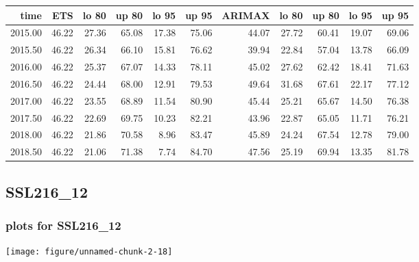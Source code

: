 \documentclass[10pt,a4paper]{article}\usepackage[]{graphicx}\usepackage[]{color}
\makeatletter
\def\maxwidth{ %
  \ifdim\Gin@nat@width>\linewidth
    \linewidth
  \else
    \Gin@nat@width
  \fi
}
\newcommand{\AaA}{\_}
\makeatother
\begin{document}
\begin{table}[ht]
\centering
\begin{tabular}{rrrrrrrrrrr}
  \hline
time & ETS  & lo 80 & up 80 & lo 95 & up 95 & ARIMAX  & lo 80 & up 80 & lo 95 & up 95 \\ 
  \hline
2015.00 & 46.22 & 27.36 & 65.08 & 17.38 & 75.06 & 44.07 & 27.72 & 60.41 & 19.07 & 69.06 \\ 
  2015.50 & 46.22 & 26.34 & 66.10 & 15.81 & 76.62 & 39.94 & 22.84 & 57.04 & 13.78 & 66.09 \\ 
  2016.00 & 46.22 & 25.37 & 67.07 & 14.33 & 78.11 & 45.02 & 27.62 & 62.42 & 18.41 & 71.63 \\ 
  2016.50 & 46.22 & 24.44 & 68.00 & 12.91 & 79.53 & 49.64 & 31.68 & 67.61 & 22.17 & 77.12 \\ 
  2017.00 & 46.22 & 23.55 & 68.89 & 11.54 & 80.90 & 45.44 & 25.21 & 65.67 & 14.50 & 76.38 \\ 
  2017.50 & 46.22 & 22.69 & 69.75 & 10.23 & 82.21 & 43.96 & 22.87 & 65.05 & 11.71 & 76.21 \\ 
  2018.00 & 46.22 & 21.86 & 70.58 & 8.96 & 83.47 & 45.89 & 24.24 & 67.54 & 12.78 & 79.00 \\ 
  2018.50 & 46.22 & 21.06 & 71.38 & 7.74 & 84.70 & 47.56 & 25.19 & 69.94 & 13.35 & 81.78 \\ 
   \hline
\end{tabular}
\end{table}

\newpage
\subsection{SSL216\AaA 12}
\subsubsection{plots for SSL216\AaA 12}

\texttt{[image: figure/unnamed-chunk-2-18]} 

\newpage
\end{document}
